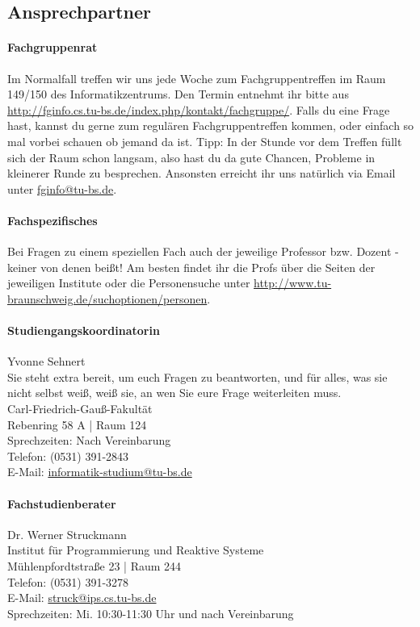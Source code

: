 \begin{multicols}{2}
\subsection{Ansprechpartner}
	\paragraph{Fachgruppenrat}
		Im Normalfall treffen wir uns jede Woche zum Fachgruppentreffen im Raum 149/150 des Informatikzentrums. Den  Termin entnehmt ihr bitte aus \url{http://fginfo.cs.tu-bs.de/index.php/kontakt/fachgruppe/}. Falls du eine Frage hast, kannst du gerne zum regulären Fachgruppentreffen kommen, oder einfach so mal vorbei schauen ob jemand da ist. Tipp: In der Stunde vor dem Treffen füllt sich der Raum schon langsam, also hast du da gute Chancen, Probleme in kleinerer Runde zu besprechen. Ansonsten erreicht ihr uns natürlich via Email unter \url{fginfo@tu-bs.de}.

	\paragraph{Fachspezifisches}
		Bei Fragen zu einem speziellen Fach auch der jeweilige Professor bzw. Dozent - keiner von denen beißt! Am besten findet ihr die Profs über die Seiten der jeweiligen Institute oder die Personensuche unter \url{http://www.tu-braunschweig.de/suchoptionen/personen}.

	\paragraph{Studiengangskoordinatorin}
		Yvonne Sehnert \\
		Sie steht extra bereit, um euch Fragen zu beantworten, und für alles, was sie nicht selbst weiß, weiß sie, an wen Sie eure Frage weiterleiten muss.\\
		Carl-Friedrich-Gauß-Fakultät\\
		Rebenring 58 A | Raum 124\\
		Sprechzeiten: Nach  Vereinbarung\\
		Telefon: (0531) 391-2843\\
		E-Mail: \url{informatik-studium@tu-bs.de}

	\paragraph{Fachstudienberater}
		Dr. Werner Struckmann\\
		Institut für Programmierung und Reaktive Systeme\\
		Mühlenpfordtstraße 23 | Raum 244\\
		Telefon: (0531) 391-3278\\
		E-Mail: \url{struck@ips.cs.tu-bs.de}\\
		Sprechzeiten: Mi. 10:30-11:30 Uhr und nach  Vereinbarung


\end{multicols}
